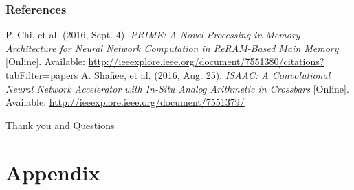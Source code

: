 \documentclass[hyperref={colorlinks}]{beamer}
\begin{document}
\begin{frame}
	\frametitle{References}
	\footnotesize{
		\begin{thebibliography}{9} %
			P. Chi, et al. (2016, Sept. 4).
			\emph{PRIME: A Novel Processing-in-Memory Architecture for Neural Network Computation in ReRAM-Based Main Memory} [Online].
			Available: \url{http://ieeexplore.ieee.org/document/7551380/citations?tabFilter=papers}
			A. Shafiee, et al. (2016, Aug. 25).
			\emph{ISAAC: A Convolutional Neural Network Accelerator with In-Situ Analog Arithmetic in Crossbars} [Online].
			Available: \url{http://ieeexplore.ieee.org/document/7551379/}
		\end{thebibliography}
	}
\end{frame}

\begin{frame}
	\Huge{\centerline{Thank you and Questions}}
\end{frame}
\section{Appendix}
\end{document}
